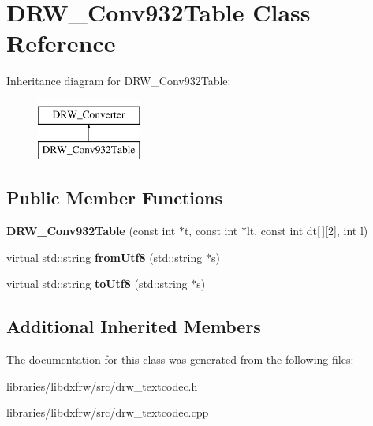 \hypertarget{classDRW__Conv932Table}{\section{D\-R\-W\-\_\-\-Conv932\-Table Class Reference}
\label{classDRW__Conv932Table}
}
Inheritance diagram for D\-R\-W\-\_\-\-Conv932\-Table\-:\begin{figure}[H]
\begin{center}
\leavevmode
\includegraphics[height=2.000000cm]{classDRW__Conv932Table}
\end{center}
\end{figure}
\subsection*{Public Member Functions}
\begin{DoxyCompactItemize}
\item 
\hypertarget{classDRW__Conv932Table_a33a1b7d1ed7da3e6cbd94c967120efcf}{{\bfseries D\-R\-W\-\_\-\-Conv932\-Table} (const int $\ast$t, const int $\ast$lt, const int dt\mbox{[}$\,$\mbox{]}\mbox{[}2\mbox{]}, int l)}\label{classDRW__Conv932Table_a33a1b7d1ed7da3e6cbd94c967120efcf}

\item 
\hypertarget{classDRW__Conv932Table_a2e74bea4bae948129748e07185a200e7}{virtual std\-::string {\bfseries from\-Utf8} (std\-::string $\ast$s)}\label{classDRW__Conv932Table_a2e74bea4bae948129748e07185a200e7}

\item 
\hypertarget{classDRW__Conv932Table_a95e995d21c572d2a0e93feff149d3594}{virtual std\-::string {\bfseries to\-Utf8} (std\-::string $\ast$s)}\label{classDRW__Conv932Table_a95e995d21c572d2a0e93feff149d3594}

\end{DoxyCompactItemize}
\subsection*{Additional Inherited Members}


The documentation for this class was generated from the following files\-:\begin{DoxyCompactItemize}
\item 
libraries/libdxfrw/src/drw\-\_\-textcodec.\-h\item 
libraries/libdxfrw/src/drw\-\_\-textcodec.\-cpp\end{DoxyCompactItemize}

